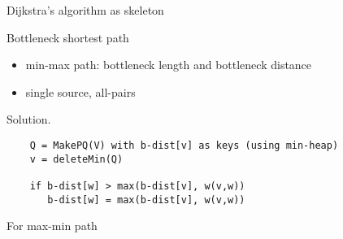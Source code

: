 \begin{frame}[fragile]{Dijkstra's algorithm as skeleton}
  \begin{exampleblock}{Bottleneck shortest path }
    \begin{itemize}
      \item min-max path: bottleneck length and bottleneck distance
      \item single source, all-pairs
    \end{itemize}
  \end{exampleblock}

  \begin{block}{Solution.}
    \begin{verbatim}
    Q = MakePQ(V) with b-dist[v] as keys (using min-heap)
    v = deleteMin(Q)

    if b-dist[w] > max(b-dist[v], w(v,w))
       b-dist[w] = max(b-dist[v], w(v,w))
    \end{verbatim}
  \end{block}

  \begin{alertblock}{For max-min path }

  \end{alertblock}
\end{frame}
